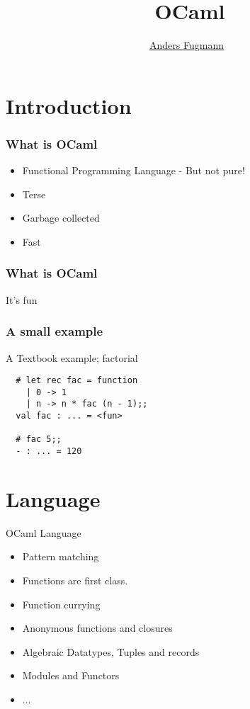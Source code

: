 \documentclass[xcolor=svgnames]{beamer}
\renewcommand{\_}{\mathunderscore}
\begin{document}
\title[Introduction to OCaml]{\
  OCaml
}
\author[Anders Fugmann]{\
  \normalfont \underline{Anders Fugmann}
}
\date{}

\maketitle

\section{Introduction}

\begin{frame}[fragile]
  \frametitle{What is OCaml}
  \pause
   \begin{itemize}
   \item Functional Programming Language - But not pure!
  \pause
   \item Terse
  \pause
   \item Garbage collected
  \pause
   \item Fast
   \end{itemize}
\end{frame}

\begin{frame}[fragile]
  \frametitle{What is OCaml}
  \begin{center}
    \Huge It's fun
  \end{center}
\end{frame}

\begin{frame}[fragile]
  \frametitle{A small example}
  A Textbook example; factorial
  \begin{lstlisting}
  # let rec fac = function
    | 0 -> 1
    | n -> n * fac (n - 1);;
  val fac : ... = <fun>

  # fac 5;;
  - : ... = 120

  \end{lstlisting}
\end{frame}

\section{Language}
\begin{frame}
  OCaml Language
  \begin{itemize}
  \item Pattern matching
  \item Functions are first class.
  \item Function currying
  \item Anonymous functions and closures
  \item Algebraic Datatypes, Tuples and records
  \item Modules and Functors
  \item ...
  \end{itemize}
\end{frame}
\end{document}
